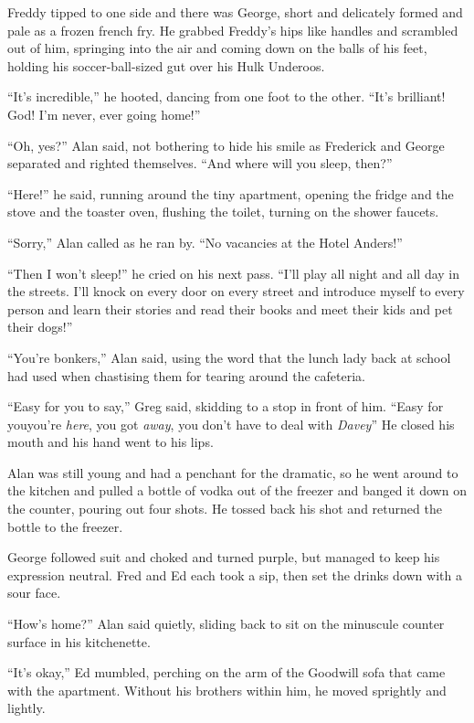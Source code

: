 Freddy tipped to one side and there was George, short and delicately
formed and pale as a frozen french fry.  He grabbed Freddy's hips like
handles and scrambled out of him, springing into the air and coming
down on the balls of his feet, holding his soccer-ball-sized gut over
his Hulk Underoos.

``It's incredible,'' he hooted, dancing from one foot to the other. 
``It's brilliant!  God!  I'm never, ever going home!''

``Oh, yes?'' Alan said, not bothering to hide his smile as Frederick
and George separated and righted themselves.  ``And where will you
sleep, then?''

``Here!'' he said, running around the tiny apartment, opening the
fridge and the stove and the toaster oven, flushing the toilet,
turning on the shower faucets.

``Sorry,'' Alan called as he ran by.  ``No vacancies at the Hotel
Anders!''

``Then I won't sleep!'' he cried on his next pass.  ``I'll play all
night and all day in the streets.  I'll knock on every door on every
street and introduce myself to every person and learn their stories
and read their books and meet their kids and pet their dogs!''

``You're bonkers,'' Alan said, using the word that the lunch lady back
at school had used when chastising them for tearing around the
cafeteria.

``Easy for you to say,'' Greg said, skidding to a stop in front of
him.  ``Easy for you\dash{}you're \textit{here}, you got \textit{away},
you don't have to deal with \textit{Davey}\dash{}'' He closed his mouth
and his hand went to his lips.

Alan was still young and had a penchant for the dramatic, so he went
around to the kitchen and pulled a bottle of vodka out of the freezer
and banged it down on the counter, pouring out four shots.  He tossed
back his shot and returned the bottle to the freezer.

George followed suit and choked and turned purple, but managed to keep
his expression neutral.  Fred and Ed each took a sip, then set the
drinks down with a sour face.

``How's home?'' Alan said quietly, sliding back to sit on the
minuscule counter surface in his kitchenette.

``It's okay,'' Ed mumbled, perching on the arm of the Goodwill sofa
that came with the apartment.  Without his brothers within him, he
moved sprightly and lightly.

